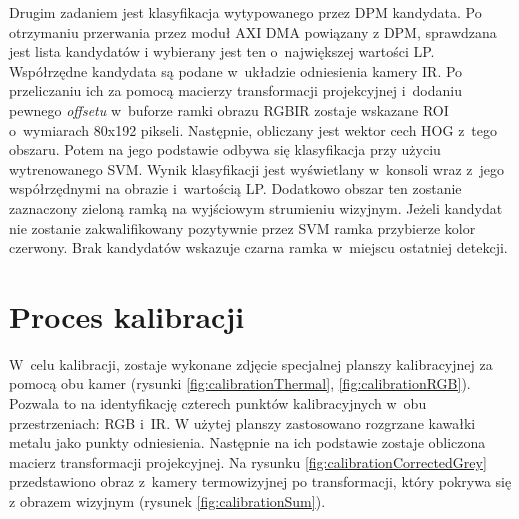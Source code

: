 Drugim zadaniem jest klasyfikacja wytypowanego przez DPM kandydata. 
Po otrzymaniu przerwania przez moduł AXI DMA powiązany z DPM, sprawdzana jest lista kandydatów i wybierany jest ten o~największej wartości LP. 
Współrzędne kandydata są podane w~układzie odniesienia kamery IR. 
Po przeliczaniu ich za pomocą macierzy transformacji projekcyjnej i~dodaniu pewnego \textit{offsetu} w~buforze ramki obrazu RGBIR zostaje wskazane ROI o~wymiarach 80x192 pikseli. 
Następnie, obliczany jest wektor cech HOG z~tego obszaru. 
Potem na jego podstawie odbywa się klasyfikacja przy użyciu wytrenowanego SVM. 
Wynik klasyfikacji jest wyświetlany w~konsoli wraz z~jego współrzędnymi na obrazie i~wartością LP. 
Dodatkowo obszar ten zostanie zaznaczony zieloną ramką na wyjściowym strumieniu wizyjnym. 
Jeżeli kandydat nie zostanie zakwalifikowany pozytywnie przez SVM ramka przybierze kolor czerwony. 
Brak kandydatów wskazuje czarna ramka w~miejscu ostatniej detekcji.

\section{Proces kalibracji}
W~celu kalibracji, zostaje wykonane zdjęcie specjalnej planszy kalibracyjnej za pomocą obu kamer (rysunki \ref{fig:calibrationThermal}, \ref{fig:calibrationRGB}). 
Pozwala to na identyfikację czterech punktów kalibracyjnych w~obu przestrzeniach: RGB i~IR. W użytej planszy zastosowano rozgrzane kawałki metalu jako punkty odniesienia.
Następnie na ich podstawie zostaje obliczona macierz transformacji projekcyjnej. 
Na rysunku \ref{fig:calibrationCorrectedGrey} przedstawiono obraz z~kamery termowizyjnej po transformacji, który pokrywa się z obrazem wizyjnym (rysunek \ref{fig:calibrationSum}).

